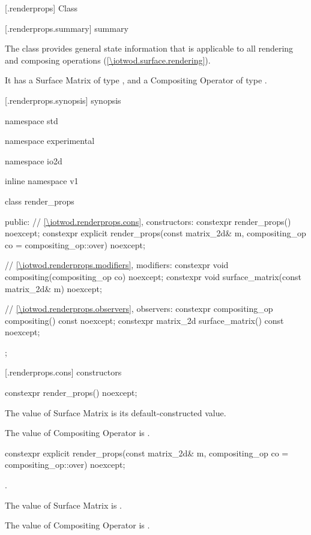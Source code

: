 
 [\iotwod.renderprops] {Class }

 [\iotwod.renderprops.summary] { summary}

\pnum
The  class provides general state information that is applicable to all rendering and composing operations (\ref{\iotwod.surface.rendering}).

\pnum
It has a Surface Matrix of type , and a Compositing Operator of type .

 [\iotwod.renderprops.synopsis] { synopsis}

\begin{codeblock}
namespace std { namespace experimental { namespace io2d { inline namespace v1 {
  class render_props {
  public:
    // \ref{\iotwod.renderprops.cons}, constructors:
    constexpr render_props() noexcept;
    constexpr explicit render_props(const matrix_2d& m,
      compositing_op co = compositing_op::over) noexcept;
    
    // \ref{\iotwod.renderprops.modifiers}, modifiers:
    constexpr void compositing(compositing_op co) noexcept;
    constexpr void surface_matrix(const matrix_2d& m) noexcept;
    
    // \ref{\iotwod.renderprops.observers}, observers:
    constexpr compositing_op compositing() const noexcept;
    constexpr matrix_2d surface_matrix() const noexcept;
  };
}}}}
\end{codeblock}

 [\iotwod.renderprops.cons] { constructors}

\begin{itemdecl}
constexpr render_props() noexcept;
\end{itemdecl}
\begin{itemdescr}
\pnum
\effects
The value of Surface Matrix is its default-constructed value.

\pnum
The value of Compositing Operator is .
\end{itemdescr}

\begin{itemdecl}
constexpr explicit render_props(const matrix_2d& m,
  compositing_op co = compositing_op::over) noexcept;
\end{itemdecl}
\begin{itemdescr}
\pnum
\requires
{}.

\pnum
\effects
The value of Surface Matrix is .

\pnum
The value of Compositing Operator is .
\end{itemdescr}

